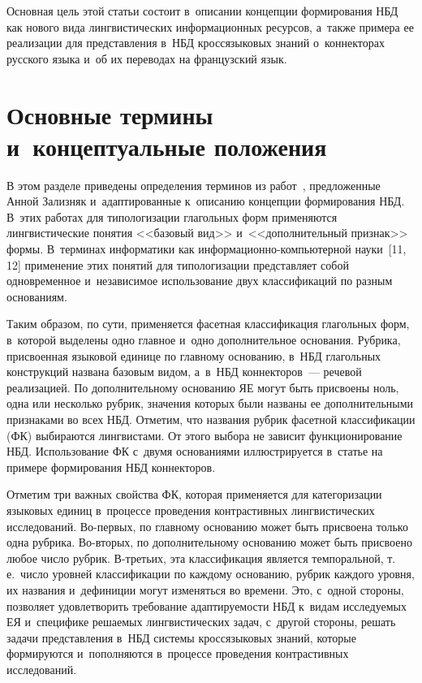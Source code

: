 \begin{multicols}{2}
  Основная цель этой статьи состоит в~описании концепции формирования 
НБД как нового вида лингвистических информационных ресурсов, а~также 
примера ее реализации для представления в~НБД кроссязыковых знаний 
о~коннекторах русского языка и~об их переводах на французский язык.

\vspace*{-6pt}
  
\section{Основные термины и~концептуальные положения}
  
  В этом разделе приведены определения терминов из  
работ~\cite{3-zat, 4-zat}, предложенные Анной Зализняк и~адаптированные 
к~описанию концепции формирования НБД. В~этих работах для 
типологизации глагольных форм применяются лингвистические понятия 
<<базовый вид>> и~<<дополнительный признак>> формы. В~терминах 
информатики как ин\-фор\-ма\-ци\-он\-но-компью\-тер\-ной науки~[11, 12] 
применение этих понятий для типологизации представляет собой 
одновременное и~независимое использование двух классификаций по разным 
основаниям.
  
  Таким образом, по сути, применяется фасетная классификация глагольных 
форм, в~которой выделены одно главное и~одно дополнительное основания. 
Рубрика, присвоенная языковой единице по главному основанию, в~НБД 
глагольных конструкций названа базовым видом, а~в~НБД коннекторов~--- 
речевой реализацией. По дополнительному основанию ЯЕ
могут быть присвоены ноль, одна или несколько руб\-рик, значения которых 
были названы ее дополнительными признаками во всех НБД. Отметим, что 
названия руб\-рик фасетной классификации (ФК) выбираются лингвистами. От 
этого выбора не зависит функционирование НБД. Использование ФК с~двумя 
основаниями иллюстрируется в~статье на примере формирования НБД 
коннекторов.
  
  Отметим три важных свойства ФК, которая применяется для 
категоризации языковых единиц в~процессе проведения контрастивных 
лингвистических исследований. Во-пер\-вых, по главному основанию может 
быть присвоена только одна рубри\-ка. Во-вто\-рых, по дополнительному 
основанию может быть присвоено любое число руб\-рик. В-третьих, эта 
классификация является темпоральной, т.\,е.\ чис\-ло уровней классификации 
по каждому основанию, руб\-рик каждого уровня, их названия и~дефиниции 
могут изменяться во времени. Это, с~одной стороны, позволяет 
удовлетворить требование адап\-ти\-ру\-емости НБД к~видам исследуемых 
ЕЯ и~специфике решаемых лингвистических задач, с~другой 
стороны, решать задачи представления в~НБД сис\-те\-мы кроссязыковых 
знаний, которые формируются и~пополняются в~процессе проведения 
контрастивных исследований.




\end{multicols}
